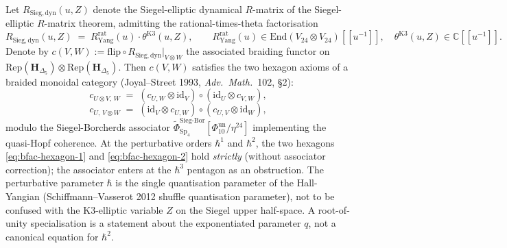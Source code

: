 \begin{theorem}
\label{thm:bfac-siegel-elliptic-braided-hexagon}
Let $R_{\mathrm{Sieg,dyn}}(u,Z)$ denote the Siegel-elliptic dynamical
$R$-matrix of the Siegel-elliptic $R$-matrix theorem, admitting the
rational-times-theta factorisation
\begin{equation}
\label{eq:bfac-rat-theta-factor}
 R_{\mathrm{Sieg,dyn}}(u,Z)
 \;=\;
 R^{\mathrm{rat}}_{\mathrm{Yang}}(u)\cdot\theta^{\mathrm{K3}}(u,Z),
 \qquad
 R^{\mathrm{rat}}_{\mathrm{Yang}}(u) \in \mathrm{End}(V_{24}\otimes V_{24})[[u^{-1}]],
 \quad
 \theta^{\mathrm{K3}}(u,Z)\in\mathbb C[[u^{-1}]].
\end{equation}
Denote by $c(V,W) := \mathrm{flip}\circ R_{\mathrm{Sieg,dyn}}\big|_{V\otimes W}$
the associated braiding functor on
$\mathrm{Rep}(\mathbf H_{\Delta_5})\otimes\mathrm{Rep}(\mathbf H_{\Delta_5})$.
Then $c(V,W)$ satisfies the two hexagon axioms of a braided monoidal
category (Joyal--Street 1993, \emph{Adv.\ Math.}~102, \S2):
\begin{equation}
\label{eq:bfac-hexagon-1}
 c_{U\otimes V,\,W}
 \;=\;
 (c_{U,W}\otimes\mathrm{id}_V)\circ(\mathrm{id}_U\otimes c_{V,W}),
\end{equation}
\begin{equation}
\label{eq:bfac-hexagon-2}
 c_{U,\,V\otimes W}
 \;=\;
 (\mathrm{id}_V\otimes c_{U,W})\circ(c_{U,V}\otimes\mathrm{id}_W),
\end{equation}
modulo the Siegel-Borcherds associator
$\widetilde\Phi^{\mathrm{Sieg\text{-}Bor}}_{\mathrm{Sp}_4}[\Phi_{10}^{\mathrm{un}}/\eta^{24}]$
implementing the quasi-Hopf coherence. At the perturbative
orders $\hbar^1$ and $\hbar^2$, the two hexagons \eqref{eq:bfac-hexagon-1}
and \eqref{eq:bfac-hexagon-2} hold \emph{strictly} (without associator
correction); the associator enters at the $\hbar^3$ pentagon as
an obstruction. The perturbative parameter $\hbar$ is the single
quantisation parameter of the Hall-Yangian (Schiffmann--Vasserot 2012
shuffle quantisation parameter), not to be confused with the K3-elliptic
variable $Z$ on the Siegel upper half-space. A root-of-unity
specialisation is a statement about the exponentiated parameter \(q\),
not a canonical equation for \(\hbar^2\).
\end{theorem}


